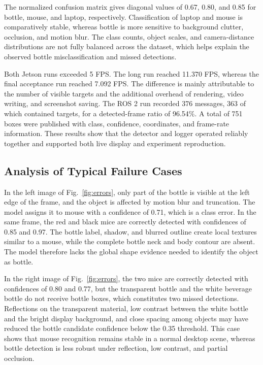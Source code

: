 \documentclass[a4paper,conference]{IEEEtran}
\begin{document}
The normalized confusion matrix gives diagonal values of 0.67, 0.80, and 0.85 for bottle, mouse, and laptop, respectively. Classification of laptop and mouse is comparatively stable, whereas bottle is more sensitive to background clutter, occlusion, and motion blur. The class counts, object scales, and camera-distance distributions are not fully balanced across the dataset, which helps explain the observed bottle misclassification and missed detections.

Both Jetson runs exceeded 5 FPS. The long run reached 11.370 FPS, whereas the final acceptance run reached 7.092 FPS. The difference is mainly attributable to the number of visible targets and the additional overhead of rendering, video writing, and screenshot saving. The ROS 2 run recorded 376 messages, 363 of which contained targets, for a detected-frame ratio of 96.54\%. A total of 751 boxes were published with class, confidence, coordinates, and frame-rate information. These results show that the detector and logger operated reliably together and supported both live display and experiment reproduction.

\subsection{Analysis of Typical Failure Cases}
In the left image of Fig.~\ref{fig:errors}, only part of the bottle is visible at the left edge of the frame, and the object is affected by motion blur and truncation. The model assigns it to mouse with a confidence of 0.71, which is a class error. In the same frame, the red and black mice are correctly detected with confidences of 0.85 and 0.97. The bottle label, shadow, and blurred outline create local textures similar to a mouse, while the complete bottle neck and body contour are absent. The model therefore lacks the global shape evidence needed to identify the object as bottle.

In the right image of Fig.~\ref{fig:errors}, the two mice are correctly detected with confidences of 0.80 and 0.77, but the transparent bottle and the white beverage bottle do not receive bottle boxes, which constitutes two missed detections. Reflections on the transparent material, low contrast between the white bottle and the bright display background, and close spacing among objects may have reduced the bottle candidate confidence below the 0.35 threshold. This case shows that mouse recognition remains stable in a normal desktop scene, whereas bottle detection is less robust under reflection, low contrast, and partial occlusion.
\end{document}

